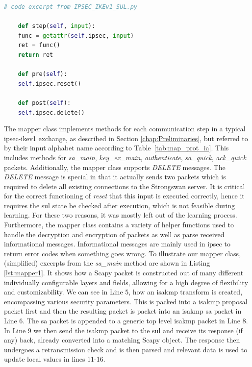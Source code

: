 \begin{lstlisting}[float=h, caption=SUL interface, label=lst:sulinterface, language=python]
	# code excerpt from IPSEC_IKEv1_SUL.py
	
	def step(self, input):
	func = getattr(self.ipsec, input)
	ret = func()
	return ret
	
	def pre(self):
	self.ipsec.reset()
	
	def post(self):
	self.ipsec.delete()
\end{lstlisting}

The mapper class implements methods for each communication step in a typical \ac{ipsec}-\ac{ike}v1 exchange, as described in Section \ref{chap:Preliminaries}, but referred to by their input alphabet name according to Table~\ref{tab:map_prot_ia}. This includes methods for \emph{sa\_main}, \emph{key\_ex\_main}, \emph{authenticate}, \emph{sa\_quick}, \emph{ack\_quick} packets. Additionally, the mapper class supports \emph{DELETE} messages. The \emph{DELETE} message is special in that it actually sends two packets which is required to delete all existing connections to the Strongswan server. It is critical for the correct functioning of \emph{reset} that this input is executed correctly, hence it requires the \ac{sul} state be checked after execution, which is not feasible during learning. For these two reasons, it was mostly left out of the learning process. Furthermore, the mapper class contains a variety of helper functions used to handle the decryption and encryption of packets as well as parse received informational messages. Informational messages are mainly used in \ac{ipsec} to return error codes when something goes wrong. To illustrate our mapper class, (simplified) excerpts from the \emph{sa\_main} method are shown in Listing \ref{lst:mapper1}. It shows how a Scapy packet is constructed out of many different individually configurable layers and fields, allowing for a high degree of flexibility and customizability. We can see in Line 5, how an \ac{isakmp} transform is created, encompassing various security parameters. This is packed into a \ac{isakmp} proposal packet first and then the resulting packet is packet into an \ac{isakmp} \ac{sa} packet in Line 6. The \ac{sa} packet is appended to a generic top level \ac{isakmp} packet in Line 8. In Line 9 we then send the \ac{isakmp} packet to the \ac{sul} and receive its response (if any) back, already converted into a matching Scapy object. The response then undergoes a retransmission check and is then parsed and relevant data is used to update local values in lines 11-16.

